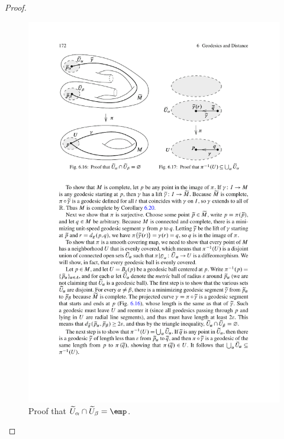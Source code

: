\begin{proof}
\begin{figure}[htbp]
\begin{minipage}[b]{200pt}
\includegraphics{pictures/local-isometry-cover-2}
\caption{Proof that $\widetilde{U}_\alpha\cap\widetilde{U}_\beta=\emp$.}
\end{minipage}
\hspace{20pt}
\begin{minipage}[b]{200pt}
\centering

\end{minipage}
\end{figure}
\end{proof}
